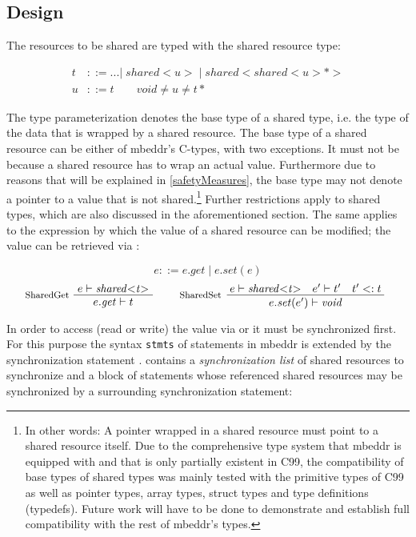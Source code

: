 \subsection{Design}
The resources to be shared are typed with the shared resource type:

\begin{equation}
\begin{split}
t & ::= ...|\;\mathit{shared{<}u{>}}\;|\;\mathit{shared{<}shared{<}u{>}{*}{>}}\\
u & ::= t \qquad \textit{void} \neq u \neq t*
\end{split}
\end{equation}

The type parameterization denotes the base type of a shared type, i.e. the type of the data that is wrapped by a shared resource. The base type of a shared resource can be either of mbeddr's C-types, with two exceptions. It must not be  because a shared resource has to wrap an actual value. Furthermore due to reasons that will be explained in \ref{safetyMeasures}, the base type may not denote a pointer to a value that is not shared.\footnote{In other words: A pointer wrapped in a shared resource must point to a shared resource itself. Due to the comprehensive type system that mbeddr is equipped with and that is only partially existent in C99, the compatibility of base types of shared types was mainly tested with the primitive types of C99 as well as pointer types, array types, struct types and type definitions (typedefs). Future work will have to be done to demonstrate and establish full compatibility with the rest of mbeddr's types.} Further restrictions apply to shared types, which are also discussed in the aforementioned section. The same applies to the  expression by which the value of a shared resource can be modified; the value can be retrieved via :

\begin{equation}
 e ::= e.\mathit{get}\;|\;e.\mathit{set(e)} 
\end{equation}
\begin{equation}
\inference*[SharedGet]{e |- \mathit{shared{<}t{>}}} {\quad e.\mathit{get} |- t \quad}
\qquad
\inference*[SharedSet]{e |- \mathit{shared{<}t{>}} \quad e' |- t' \quad t' <: t} {\qquad\quad e.\mathit{set}(e') |- \mathit{void} \quad\qquad} 
\end{equation}

In order to access (read or write) the value via  or  it must be synchronized first. For this purpose the syntax \texttt{stmts} of statements in mbeddr is extended by the synchronization statement .  contains a \textit{synchronization list} of shared resources to synchronize and a block of statements whose referenced shared resources may be synchronized by a surrounding synchronization statement:

